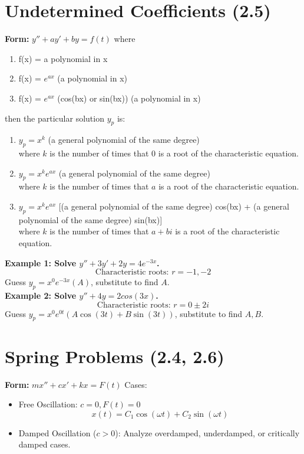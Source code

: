 \documentclass[10pt]{article}
\begin{document}
\begin{multicols}{2}
\section*{Undetermined Coefficients (2.5)}
\textbf{Form:} \( y'' + ay' + by = f(t) \)
where
\begin{enumerate}
    \item f(x) = a polynomial in x
    \item f(x) = \( e^{ax} \) (a polynomial in x)
    \item f(x) = \( e^{ax} \) (cos(bx) or sin(bx)) (a polynomial in x)
\end{enumerate}
then the particular solution $y_p$ is:
\begin{enumerate}
    \item $y_p = x^k$ (a general polynomial of the same degree) \\
    where $k$ is the number of times that 0 is a root of the characteristic equation.
    \item $y_p = x^k e^{ax}$ (a general polynomial of the same degree) \\
    where $k$ is the number of times that $a$ is a root of the characteristic equation.
    \item $y_p = x^k e^{ax}$ [(a general polynomial of the same degree) cos(bx) + (a general polynomial of the same degree) sin(bx)] \\
    where $k$ is the number of times that $a + bi$ is a root of the characteristic equation.
\end{enumerate}

\textbf{Example 1: Solve \( y'' + 3y' + 2y = 4e^{-3x} \).}  
\[
\text{Characteristic roots: } r = -1, -2
\]
Guess \( y_p = x^0 e^{-3x}(A)\), substitute to find \( A \). \\
\textbf{Example 2: Solve \( y'' + 4y = 2cos(3x) \).}
\[
\text{Characteristic roots: } r= 0 \pm 2i
\]
Guess \( y_p = x^0 e^{0t} (A\cos(3t) + B\sin(3t)) \), substitute to find \( A, B \).

\section*{Spring Problems (2.4, 2.6)}
\textbf{Form:} \( mx'' + cx' + kx = F(t) \)  
Cases:
\begin{itemize}
    \item Free Oscillation: \( c = 0, F(t) = 0 \)
    \[
    x(t) = C_1\cos(\omega t) + C_2\sin(\omega t)
    \]
    \item Damped Oscillation (\( c > 0 \)): Analyze overdamped, underdamped, or critically damped cases.
\end{itemize}


\end{multicols}
\end{document}
